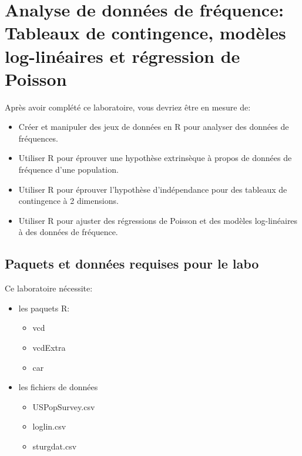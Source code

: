 \documentclass[
  12pt,
]{book}
\providecommand{\tightlist}{%
  \setlength{\itemsep}{0pt}\setlength{\parskip}{0pt}}
\begin{document}
\hypertarget{analyse-de-donnuxe9es-de-fruxe9quence-tableaux-de-contingence-moduxe8les-log-linuxe9aires-et-ruxe9gression-de-poisson}{%
\chapter{Analyse de données de fréquence: Tableaux de contingence, modèles log-linéaires et régression de Poisson}\label{analyse-de-donnuxe9es-de-fruxe9quence-tableaux-de-contingence-moduxe8les-log-linuxe9aires-et-ruxe9gression-de-poisson}}

Après avoir complété ce laboratoire, vous devriez être en mesure de:

\begin{itemize}
\tightlist
\item
  Créer et manipuler des jeux de données en R pour analyser des données de fréquences.
\item
  Utiliser R pour éprouver une hypothèse extrinsèque à propos de données de fréquence d'une population.
\item
  Utiliser R pour éprouver l'hypothèse d'indépendance pour des tableaux de contingence à 2 dimensions.
\item
  Utiliser R pour ajuster des régressions de Poisson et des modèles log-linéaires à des données de fréquence.
\end{itemize}

\hypertarget{set-freq}{%
\section{Paquets et données requises pour le labo}\label{set-freq}}

Ce laboratoire nécessite:

\begin{itemize}
\tightlist
\item
  les paquets R:

  \begin{itemize}
  \tightlist
  \item
    vcd
  \item
    vcdExtra
  \item
    car
  \end{itemize}
\item
  les fichiers de données

  \begin{itemize}
  \tightlist
  \item
    USPopSurvey.csv
  \item
    loglin.csv
  \item
    sturgdat.csv
  \end{itemize}
\end{itemize}
\end{document}
